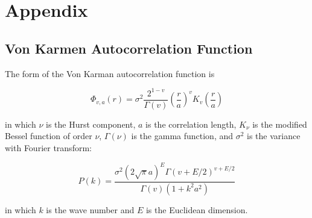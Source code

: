 
\appendix
\linespread{1.7}
\chapter*{Appendix}
\linespread{2.0}
\renewcommand{\thesection}{A}
\renewcommand{\thesubsection}{A\arabic{subsection}}
\renewcommand{\thefigure}{A\arabic{figure}}
\renewcommand{\theequation}{A\arabic{equation}}
\renewcommand{\thetable}{A\arabic{table}}


\linespread{1.7}
\section{Von Karmen Autocorrelation Function}
\linespread{2.0}
\label{app:A}

The form of the Von Karman autocorrelation function \citep{frankelFiniteDifferenceSimulations1986} is

\begin{equation}\label{eq:app-A1}
    \Phi_{v, a}(r)=\sigma^{2} \frac{2^{1-v}}{\Gamma(v)}\left(\frac{r}{a}\right)^{v} K_{v}\left(\frac{r}{a}\right)
\end{equation}

\noindent in which $\nu$ is the Hurst component, $a$ is the correlation length, $K_{\nu}$ is the modified Bessel function of order $\nu$, $\Gamma(\nu)$ is the gamma function, and $\sigma^2$ is the variance with Fourier transform:

\begin{equation}\label{eq:app-A2}
    P(k)=\frac{\sigma^{2}(2 \sqrt{\pi} a)^{E} \Gamma(v+E / 2)^{v+E / 2}}{\Gamma(v)\left(1+k^{2} a^{2}\right)}
\end{equation}

\noindent in which $k$ is the wave number and $E$ is the Euclidean dimension.







